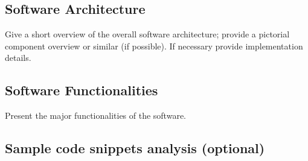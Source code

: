 \subsection{Software Architecture}
\label{}

Give a short overview of the overall software architecture; provide a pictorial component overview or similar (if possible). If necessary provide implementation details.

\subsection{Software Functionalities}
\label{}

Present the major functionalities of the software.

\subsection{Sample code snippets analysis (optional)}
\label{}